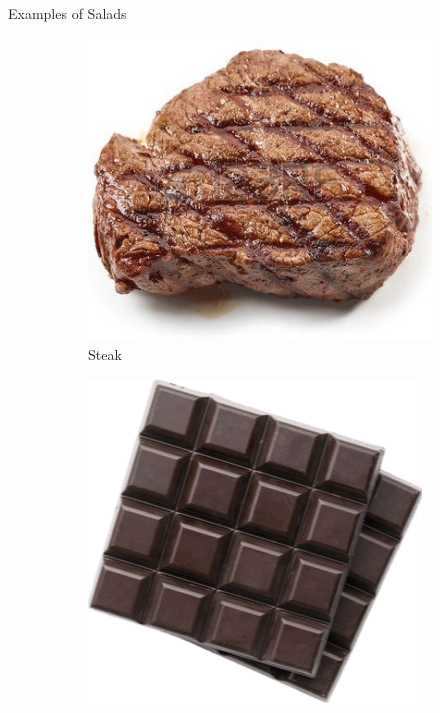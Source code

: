 \documentclass{beamer}
\begin{document}
\begin{frame}{Examples of Salads}
    \begin{figure}
        \begin{subfigure}{.3\textwidth}
          \centering
          \includegraphics[width=.8\linewidth]{salad/30_steak.jpg}
          \caption{\label{fig:steak}Steak}
        \end{subfigure}
        \begin{subfigure}{.35\textwidth}
          \centering
          \includegraphics[width=.8\linewidth]{salad/31_chocolate.png}

\end{subfigure}
\end{figure}
\end{frame}
\end{document}
